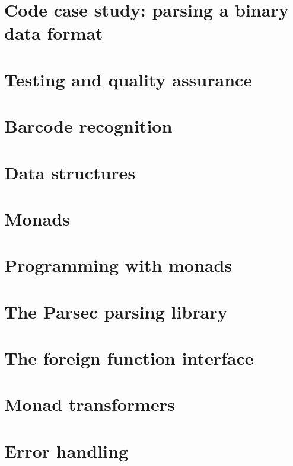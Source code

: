 \documentclass[UTF8]{ctexart}
\begin{document}
\section{Code case study: parsing a binary data format}

\newpage

\section{Testing and quality assurance}

\newpage

\section{Barcode recognition}

\newpage

\section{Data structures}

\newpage

\section{Monads}

\newpage

\section{Programming with monads}

\newpage

\section{The Parsec parsing library}

\newpage

\section{The foreign function interface}

\newpage

\section{Monad transformers}

\newpage

\section{Error handling}

\newpage
\end{document}
